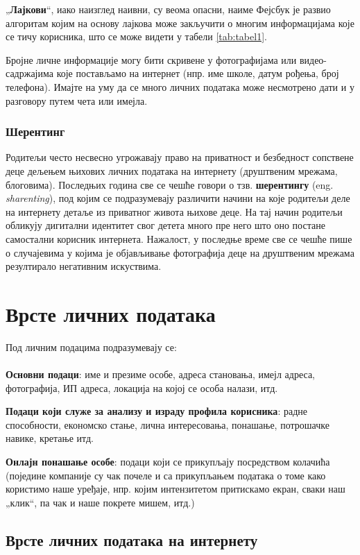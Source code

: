 \documentclass[a4paper]{article}
\begin{document}
„\textbf{Лајкови}“, иако наизглед наивни, су веома опасни, наиме Фејсбук је развио алгоритам којим на основу лајкова може закључити о многим информацијама које се тичу корисника, што се може видети у табели \ref {tab:tabel1}.

Бројне личне информације могу бити скривене у фотографијама или видео-садржајима које постављамо на интернет (нпр. име школе, датум рођења, број телефона). Имајте на уму да се много личних података може несмотрено дати и у разговору путем чета или имејла.
\subsubsection{Шерентинг}

Родитељи често несвесно угрожавају право на приватност и безбедност сопствене деце дељењем њихових личних података на интернету (друштвеним мрежама, блоговима). Последњих година све се чешће говори о тзв. \textbf{шерентингу} (eng. \emph{sharenting}), под којим се подразумевају различити начини на које родитељи деле на интернету детаље из приватног живота њихове деце. На тај начин родитељи обликују дигитални идентитет  свог детета много пре него што оно постане самостални корисник интернета. Нажалост, у последње време све се чешће пише о случајевима у којима је објављивање фотографија деце на друштвеним мрежама резултирало негативним искуствима.
    

\section{Врсте личних података}

Под личним подацима подразумевају се:
\paragraph{}
\textbf{Основни подаци}:
име и презиме особе, адреса становања, имејл адреса, фотографија, ИП адреса, локација на којој се особа налази, итд.

\textbf{Подаци који служе за анализу и израду профила корисника}: радне способности, економско стање, лична интересовања, понашање, потрошачке навике, кретање итд.

\textbf{Онлајн понашање особе}: подаци који се прикупљају посредством колачића (поједине компаније су чак почеле и са прикупљањем података о томе како користимо наше уређаје, нпр. којим интензитетом притискамо екран, сваки наш „клик“, па чак и наше покрете мишем, итд.)
\subsection{Врсте личних података на интернету}
\end{document}
